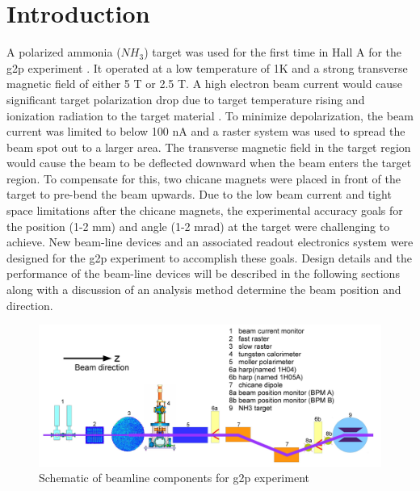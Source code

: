 \documentclass[english,review,number,sort&compress]{elsarticle}
\begin{document}
\section{Introduction}

A polarized ammonia ($NH_{3}$) target was used for the first time in Hall A for the g2p experiment \citep{g2pproposal}. It operated at a low temperature of 1K and a strong transverse magnetic field of either 5 T or 2.5 T. A high electron beam current would cause significant target polarization drop due to target temperature rising and ionization radiation to the target material \citep{Crabb67}. To minimize depolarization, the beam current was limited to below 100 nA and a raster system was used to spread the beam spot out to a larger area. The transverse magnetic field in the target region would cause the beam to be deflected downward when the beam enters the target region. To compensate for this, two chicane magnets were placed in front of the target to pre-bend the beam upwards. Due to the low beam current and tight space limitations after the chicane magnets, the experimental accuracy goals for the position (1-2 mm) and angle (1-2 mrad) at the target were challenging to achieve. New beam-line devices and an associated readout electronics system were designed for the g2p experiment to accomplish these goals. Design details and the performance of the beam-line devices will be described in the following sections along with a discussion of an analysis method determine the beam position and direction. 
\begin{figure}[tbph]
\begin{centering}
\includegraphics[width=1\columnwidth]{beamline_lite} 
\par\end{centering}

\protect\caption{\label{fig:beamline-for-g2p}Schematic of beamline components for g2p experiment}
\end{figure}
\end{document}
